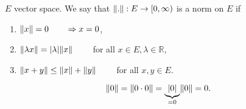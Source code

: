 	
\begin{definition*}[norm]
	$E$ vector space. We say that $\norm{.}: E \to [0,\infty)$ is a norm on $E$ if
	\begin{enumerate}[1)]
		\item $\norm{x}=0 \qquad \Rightarrow x =0$,
		\item $\norm{\lambda x} = \abs{\lambda} \norm{x} \qquad $ for all $x \in E, \lambda \in \mathbb{R}$,
		\item $\norm{x+y} \leq \norm{x} + \norm{y} \qquad $ for all $x,y \in E$.
	\end{enumerate}
	
\end{definition*}
\begin{bemerkung}
	\[
		\norm{0} = \norm{0 \cdot 0} = \underset{=0}{\underbrace{\abs{0}}} \norm{0} = 0.
	\]
\end{bemerkung}
